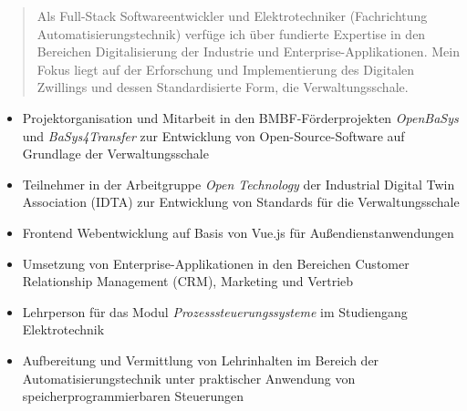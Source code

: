 \documentclass[10pt,a4paper,ragged2e,withhyper]{altacv}
\begin{document}
\begin{paracol}{2}
            \begin{quote}
                Als Full-Stack Softwareentwickler und Elektrotechniker (Fachrichtung Automatisierungstechnik) verfüge ich über fundierte Expertise in den Bereichen Digitalisierung der Industrie und Enterprise-Applikationen.
                Mein Fokus liegt auf der Erforschung und Implementierung des Digitalen Zwillings und dessen Standardisierte Form, die Verwaltungsschale.
            \end{quote}
        
            \begin{itemize}
                \item Projektorganisation und Mitarbeit in den BMBF-Förderprojekten \textit{OpenBaSys}\\ und \textit{BaSys4Transfer} zur Entwicklung von Open-Source-Software auf Grundlage der Verwaltungsschale
                \item Teilnehmer in der Arbeitgruppe \textit{Open Technology} der Industrial Digital Twin Association (IDTA) zur Entwicklung von Standards für die Verwaltungsschale
            \end{itemize}
            \divider
            
            \begin{itemize}
                \item Frontend Webentwicklung auf Basis von Vue.js für Außendienstanwendungen
                \item Umsetzung von Enterprise-Applikationen in den Bereichen Customer Relationship Management (CRM), Marketing und Vertrieb
            \end{itemize}
            \divider

            \begin{itemize}
                \item Lehrperson für das Modul \textit{Prozesssteuerungssysteme} im Studiengang Elektrotechnik
                \item Aufbereitung und Vermittlung von Lehrinhalten im Bereich der Automatisierungstechnik unter praktischer Anwendung von speicherprogrammierbaren Steuerungen
            \end{itemize}
        

\end{paracol}
\end{document}
